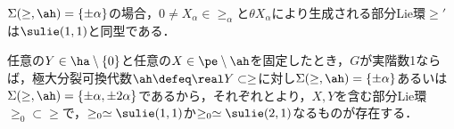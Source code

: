 \begin{lem}\label{lem:su11}
  
  $\Sigma(\ge,\ah) = \{\pm\alpha\}$の場合，$0\neq X_{\alpha}\in \ge_{\alpha}$と$\theta X_{\alpha}$により生成される部分Lie環$\ge'$は$\sulie(1,1)$と同型である．
\end{lem}

\begin{cor}\label{cor:sub-lie-alg}
  任意の$Y\in \ha\setminus\{0\} $と任意の$X\in \pe\setminus \ah$を固定したとき，$G$が実階数1ならば，極大分裂可換代数$\ah\defeq \real Y\subset \ge$に対し$\Sigma(\ge,\ah) = \{\pm\alpha\} $あるいは$\Sigma(\ge,\ah)  = \{\pm\alpha, \pm 2\alpha \} $であるから，それぞれとより，$X,Y$を含む部分Lie環$\ge_0\subset \ge$で，$\ge_0\simeq \sulie(1,1) $か$\ge_0\simeq \sulie(2,1)$なるものが存在する．
\end{cor}

